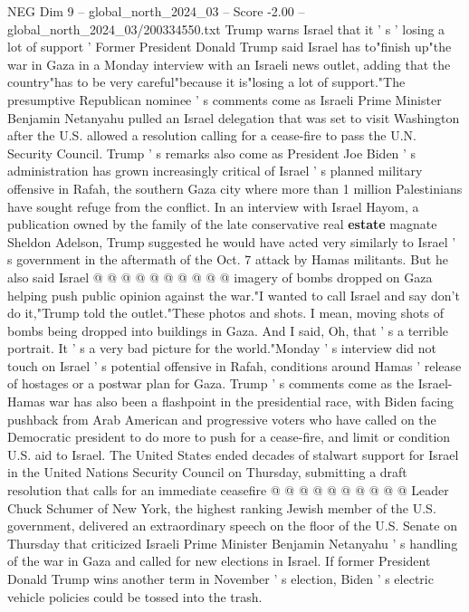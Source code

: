 \begin{textsample}{NEG Dim 9 – global\_north\_2024\_03 – Score -2.00 – global\_north\_2024\_03/200334550.txt}  \label{ex:f9_neg_185}
Trump warns Israel that it ' s ' losing a lot of support ' Former President Donald Trump said Israel has to"finish up"the war in Gaza in a Monday interview with an Israeli news outlet, adding that the country"has to be very careful"because it is"losing a lot of support."The presumptive Republican nominee ' s comments come as Israeli Prime Minister Benjamin Netanyahu pulled an Israel delegation that was set to visit Washington after the U.S. allowed a resolution calling for a cease-fire to pass the U.N.
Security Council.
Trump ' s remarks also come as President Joe Biden ' s administration has grown increasingly critical of Israel ' s planned military offensive in Rafah, the southern Gaza city where more than 1 million Palestinians have sought refuge from the conflict.
In an interview with Israel Hayom, a publication owned by the family of the late conservative real \textbf{estate} magnate Sheldon Adelson, Trump suggested he would have acted very similarly to Israel ' s government in the aftermath of the Oct. 7 attack by Hamas militants.
But he also said Israel @ @ @ @ @ @ @ @ @ @ imagery of bombs dropped on Gaza helping push public opinion against the war."I wanted to call Israel and say don't do it,"Trump told the outlet."These photos and shots.
I mean, moving shots of bombs being dropped into buildings in Gaza.
And I said, Oh, that ' s a terrible portrait.
It ' s a very bad picture for the world."Monday ' s interview did not touch on Israel ' s potential offensive in Rafah, conditions around Hamas ' release of hostages or a postwar plan for Gaza.
Trump ' s comments come as the Israel-Hamas war has also been a flashpoint in the presidential race, with Biden facing pushback from Arab American and progressive voters who have called on the Democratic president to do more to push for a cease-fire, and limit or condition U.S. aid to Israel.
The United States ended decades of stalwart support for Israel in the United Nations Security Council on Thursday, submitting a draft resolution that calls for an immediate ceasefire @ @ @ @ @ @ @ @ @ @ Leader Chuck Schumer of New York, the highest ranking Jewish member of the U.S. government, delivered an extraordinary speech on the floor of the U.S.
Senate on Thursday that criticized Israeli Prime Minister Benjamin Netanyahu ' s handling of the war in Gaza and called for new elections in Israel.
If former President Donald Trump wins another term in November ' s election, Biden ' s electric vehicle policies could be tossed into the trash.

\end{textsample}

